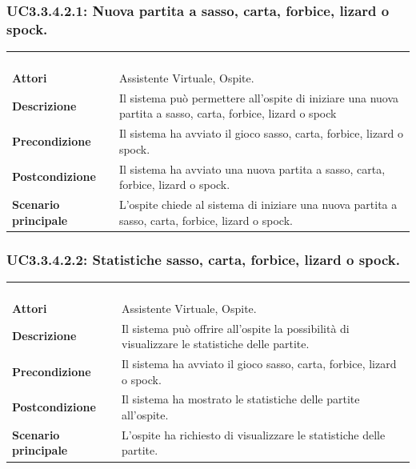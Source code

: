 \subsubsection{UC3.3.4.2.1: Nuova partita a sasso, carta, forbice, lizard o spock.}
\label{UC3.3.4.2.1}
\begin{longtable}{l|p{10cm}}
\rowcolor[gray]{0.8} \multicolumn{2}{c}{} \\
\rowcolor[gray]{0.8} \multicolumn{2}{c}{\textbf{UC3.3.4.2.1 - Nuova partita a sasso, carta, forbice, lizard o spock.}} \\
\rowcolor[gray]{0.8} \multicolumn{2}{c}{} \\
\hline
&\\
\textbf{Attori} & Assistente Virtuale, Ospite.\\[7pt]
\textbf{Descrizione} & Il sistema può permettere all'ospite di iniziare una nuova partita a sasso, carta, forbice, lizard o spock\\[7pt]
\textbf{Precondizione} & Il sistema ha avviato il gioco sasso, carta, forbice, lizard o spock.\\[7pt]
\textbf{Postcondizione} & Il sistema ha avviato una nuova partita a sasso, carta, forbice, lizard o spock.\\[7pt]
\textbf{Scenario principale} &L'ospite chiede al sistema di iniziare una nuova partita a sasso, carta, forbice, lizard o spock.\\[7pt]\hline
\end{longtable}

\subsubsection{UC3.3.4.2.2: Statistiche sasso, carta, forbice, lizard o spock.}
\label{UC3.3.4.2.2}
\begin{longtable}{l|p{10cm}}
\rowcolor[gray]{0.8} \multicolumn{2}{c}{} \\
\rowcolor[gray]{0.8} \multicolumn{2}{c}{\textbf{UC3.3.4.2.2 - Statistiche sasso, carta, forbice, lizard o spock.}} \\
\rowcolor[gray]{0.8} \multicolumn{2}{c}{} \\
\hline
&\\
\textbf{Attori} & Assistente Virtuale, Ospite.\\[7pt]
\textbf{Descrizione} & Il sistema può offrire all'ospite la possibilità di visualizzare le statistiche delle partite.\\[7pt]
\textbf{Precondizione} & Il sistema ha avviato il gioco sasso, carta, forbice, lizard o spock.\\[7pt]
\textbf{Postcondizione} & Il sistema ha mostrato le statistiche delle partite all'ospite.\\[7pt]
\textbf{Scenario principale} &L'ospite ha richiesto di visualizzare le statistiche delle partite.\\[7pt]\hline
\end{longtable}


